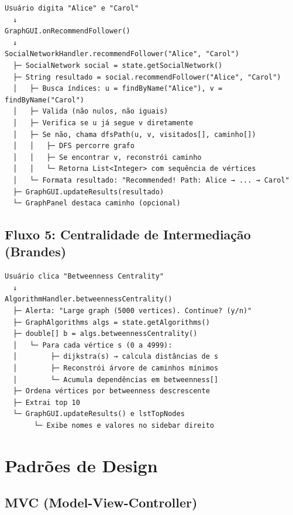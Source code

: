 \documentclass[12pt,a4paper]{article}
\begin{document}
    \begin{verbatim}
Usuário digita "Alice" e "Carol"
  ↓
GraphGUI.onRecommendFollower()
  ↓
SocialNetworkHandler.recommendFollower("Alice", "Carol")
  ├─ SocialNetwork social = state.getSocialNetwork()
  ├─ String resultado = social.recommendFollower("Alice", "Carol")
  │   ├─ Busca índices: u = findByName("Alice"), v = findByName("Carol")
  │   ├─ Valida (não nulos, não iguais)
  │   ├─ Verifica se u já segue v diretamente
  │   ├─ Se não, chama dfsPath(u, v, visitados[], caminho[])
  │   │   ├─ DFS percorre grafo
  │   │   ├─ Se encontrar v, reconstrói caminho
  │   │   └─ Retorna List<Integer> com sequência de vértices
  │   └─ Formata resultado: "Recommended! Path: Alice → ... → Carol"
  ├─ GraphGUI.updateResults(resultado)
  └─ GraphPanel destaca caminho (opcional)
    \end{verbatim}

    \subsection{Fluxo 5: Centralidade de Intermediação (Brandes)}

    \begin{verbatim}
Usuário clica "Betweenness Centrality"
  ↓
AlgorithmHandler.betweennessCentrality()
  ├─ Alerta: "Large graph (5000 vertices). Continue? (y/n)"
  ├─ GraphAlgorithms algs = state.getAlgorithms()
  ├─ double[] b = algs.betweennessCentrality()
  │   └─ Para cada vértice s (0 a 4999):
  │        ├─ dijkstra(s) → calcula distâncias de s
  │        ├─ Reconstrói árvore de caminhos mínimos
  │        └─ Acumula dependências em betweenness[]
  ├─ Ordena vértices por betweenness descrescente
  ├─ Extrai top 10
  └─ GraphGUI.updateResults() e lstTopNodes
       └─ Exibe nomes e valores no sidebar direito
    \end{verbatim}

    \newpage

    \section{Padrões de Design}

    \subsection{MVC (Model-View-Controller)}
\end{document}
